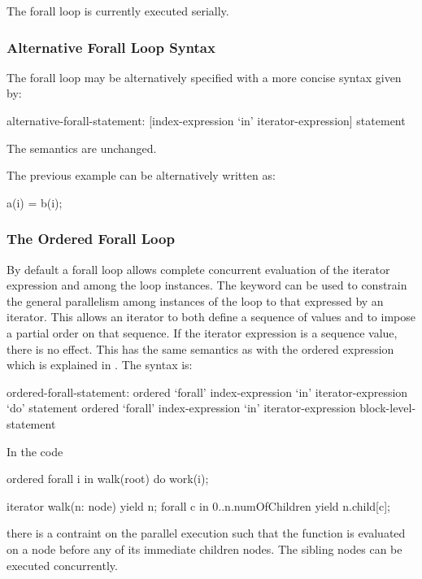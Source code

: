 \begin{implementation}
The forall loop is currently executed serially.
\end{implementation}

\subsubsection{Alternative Forall Loop Syntax}
\label{Alternative_Forall_Loop_Syntax}

The forall loop may be alternatively specified with a more concise
syntax given by:
\begin{syntax}
alternative-forall-statement:
  [index-expression `in' iterator-expression] statement
\end{syntax}
The semantics are unchanged.

\begin{example}
The previous  example can be alternatively written as:
\begin{chapel}
[i in 1..N] a(i) = b(i);
\end{chapel}
\end{example}

\subsubsection{The Ordered Forall Loop}
\label{Ordered_Forall}

By default a forall loop allows complete concurrent evaluation of the
iterator expression and among the loop instances. The
keyword  can be used to constrain the general
parallelism among instances of the loop to that expressed by an
iterator. This allows an iterator to both define a sequence of values
and to impose a partial order on that sequence. If the iterator
expression is a sequence value, there is no effect. This has the same
semantics as with the ordered expression which is explained
in .  The syntax is:
\begin{syntax}
ordered-forall-statement:
   ordered `forall' index-expression `in' iterator-expression `do' statement
   ordered `forall' index-expression `in' iterator-expression block-level-statement
\end{syntax}

\begin{example}
In the code
\begin{chapel}
ordered forall i in walk(root) do
  work(i);

iterator walk(n: node) {
  yield n;
  forall c in 0..n.numOfChildren {
      yield n.child[c];
  }
}
\end{chapel}
there is a contraint on the parallel execution such that the
function  is evaluated on a node before any of its
immediate children nodes.  The sibling nodes can be executed
concurrently.
\end{example}

